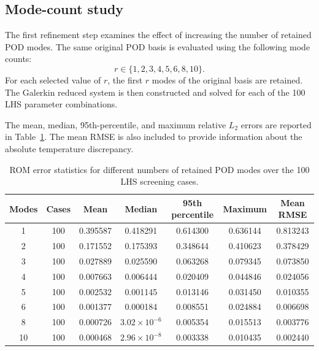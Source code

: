 \subsection{Mode-count study}

The first refinement step examines the effect of increasing
the number of retained POD modes. The same original POD basis
is evaluated using the following mode counts:
\[
\boxed{
r\in\{1,2,3,4,5,6,8,10\}.
}
\]
For each selected value of $r$, the first $r$ modes of the
original basis are retained. The Galerkin reduced system is
then constructed and solved for each of the 100 LHS
parameter combinations.

The mean, median, 95th-percentile, and maximum relative
$L_2$ errors are reported in Table~\ref{tab:mode_count_errors}.
The mean RMSE is also included to provide information about
the absolute temperature discrepancy.

\begin{table}[htbp]
    \centering
    \caption{ROM error statistics for different numbers of
    retained POD modes over the 100 LHS screening cases.}
    \label{tab:mode_count_errors}
    \small
    \begin{tabular}{ccccccc}
        \toprule
        \textbf{Modes} &
        \textbf{Cases} &
        \textbf{Mean} &
        \textbf{Median} &
        \textbf{95th percentile} &
        \textbf{Maximum} &
        \textbf{Mean RMSE} \\
        \midrule
        1  & 100 & 0.395587 & 0.418291 & 0.614300 & 0.636144 & 0.813243 \\
        2  & 100 & 0.171552 & 0.175393 & 0.348644 & 0.410623 & 0.378429 \\
        3  & 100 & 0.027889 & 0.025590 & 0.063268 & 0.079345 & 0.073850 \\
        4  & 100 & 0.007663 & 0.006444 & 0.020409 & 0.044846 & 0.024056 \\
        5  & 100 & 0.002532 & 0.001145 & 0.013146 & 0.031450 & 0.010355 \\
        6  & 100 & 0.001377 & 0.000184 & 0.008551 & 0.024884 & 0.006698 \\
        8  & 100 & 0.000726 & $3.02\times10^{-6}$ & 0.005354 & 0.015513 & 0.003776 \\
        10 & 100 & 0.000468 & $2.96\times10^{-8}$ & 0.003338 & 0.010435 & 0.002440 \\
        \bottomrule
    \end{tabular}
\end{table}

